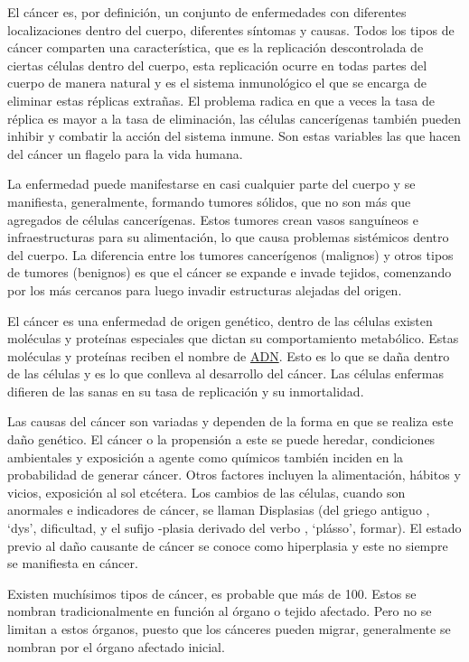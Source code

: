 
El cáncer es, por definición, un conjunto de enfermedades con diferentes
localizaciones dentro del cuerpo, diferentes síntomas y causas. Todos los tipos
de cáncer comparten una característica, que es la replicación descontrolada de
ciertas células dentro del cuerpo, esta replicación ocurre en todas partes del
cuerpo de manera natural y es el sistema inmunológico el que se encarga de
eliminar estas réplicas extrañas. El problema radica en que a veces la tasa de
réplica es mayor a la tasa de eliminación, las células cancerígenas también
pueden inhibir y combatir la acción del sistema inmune. Son estas variables las
que hacen del cáncer un flagelo para la vida humana.

La enfermedad puede manifestarse en casi cualquier parte del cuerpo y se
manifiesta, generalmente, formando tumores sólidos, que no son
más que agregados de células cancerígenas. Estos tumores crean vasos sanguíneos
e infraestructuras para su alimentación, lo que causa problemas sistémicos
dentro del cuerpo. La diferencia entre los tumores cancerígenos (malignos) y
otros tipos de tumores (benignos) es que el cáncer se expande e invade tejidos,
comenzando por los más cercanos para luego invadir estructuras alejadas del
origen.

El cáncer es una enfermedad de origen genético, dentro de las células existen
moléculas y proteínas especiales que dictan su comportamiento metabólico. Estas
moléculas y proteínas reciben el nombre de \hyperlink{abbr}{ADN}. Esto es lo que
se daña dentro de las células y es lo que conlleva al desarrollo del cáncer. Las
células enfermas difieren de las sanas en su tasa de replicación y su
inmortalidad.

Las causas del cáncer son variadas y dependen de la forma en que se realiza este
daño genético. El cáncer o la propensión a este se puede heredar, condiciones
ambientales y exposición a agente como químicos también inciden en la
probabilidad de generar cáncer. Otros factores incluyen la alimentación, hábitos
y vicios, exposición al sol etcétera. Los cambios de las células, cuando son
anormales e indicadores de cáncer, se llaman Displasias  (del
griego antiguo \textdelta\textupsilon\textvarsigma, `dys', dificultad, y el
sufijo -plasia derivado del verbo
\textpi\textlambda\textalpha\textsigma\textsigma\textomega, `plásso', formar).
El estado previo al daño causante de cáncer se conoce como hiperplasia y este no
siempre se manifiesta en cáncer.

Existen muchísimos tipos de cáncer, es probable que más de 100. Estos se nombran
tradicionalmente en función al órgano o tejido afectado. Pero no se limitan a
estos órganos, puesto que los cánceres pueden migrar, generalmente se nombran
por el órgano afectado inicial.


